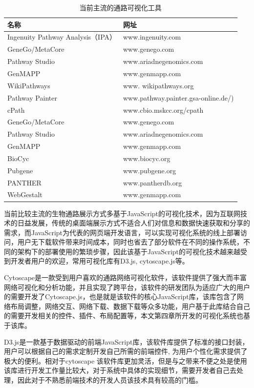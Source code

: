 \begin{table}[htbp]
  \centering
	\caption[table2]{当前主流的通路可视化工具}
\vspace{0.5em}\wuhao
\begin{tabularx}{1.0\textwidth}{lX}
\toprule[1.5pt]
名称 & 网址 \\
\midrule[1pt]
Ingenuity Pathway Analysis（IPA）	& www.ingenuity.com\\
GeneGo/MetaCore 	& www.genego.com\\
Pathway Studio 	& www.ariadnegenomics.com\\
GenMAPP	       & www.genmapp.com\\
WikiPathways & www. wikipathways.org\\
Pathway Painter	 & www.pathway.painter.gsa-online.de/)\\
cPath	& www.cbio.mskcc.org/cpath\\
GeneGo/MetaCore 	& www.genego.com\\
Pathway Studio 	& www.ariadnegenomics.com\\
GenMAPP	& www.genmapp.com\\
BioCyc	& www.biocyc.org\\
Pubgene	& www.pubgene.org\\
PANTHER	& www.pantherdb.org\\
WebGestalt	& www.genmapp.com\\

\bottomrule[1.5pt]
\end{tabularx}
\end{table}

当前比较主流的生物通路展示方式多基于JavaScript的可视化技术，因为互联网技术的日益发展，传统的桌面端展示方式不适合人们对信息和数据快速获取和分享的需求，而JavaScript为代表的网页端开发语言，可以实现可视化系统的线上部署访问，用户无下载软件带来时间成本，同时也省去了部分软件在不同的操作系统，不同的架构下的部署使用的繁琐步骤，因此该基于JavaScript的可视化技术越来越受到开发者用户的欢迎，常用可视化库有D3.js, cytoscape.js等。


Cytoscape\cite{}是一款受到用户喜欢的通路网络可视化软件，该软件提供了强大而丰富网络可视化和分析功能，并且实现了跨平台，该软件的研发团队为适应广大的用户的需要开发了Cytoscape.js，也是就是该软件的核心JavaScript库，该库包含了网络布局调整，网络交互、网络下载、数据下载等众多功能，用户基于此库结合自己的需要开发相关的控件、插件、布局配置等，本文第四章所开发的可视化系统也基于该库。


D3.js\cite{}是一款基于数据驱动的前端JavaScript库，该软件库提供了标准的接口封装，用户可以根据自己的需求定制开发自己所需的前端控件, 为用户个性化需求提供了极大的便利。相对于cytoscape 该软件库更加灵活，但是与之带来不便之处是使用该库进行开发工作量比较大，对于系统中具体的实现细节，需要开发者自己去处理，因此对于不熟悉前端技术的开发人员该技术具有较高的门槛。

